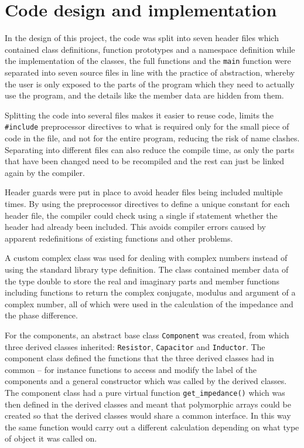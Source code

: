 \section{Code design and implementation}
\label{sec:code}
In the design of this project, the code was split into seven header files which contained class definitions, function prototypes and a namespace definition while the implementation of the classes, the full functions and the \verb!main! function were separated into seven source files in line with the practice of abstraction, whereby the user is only exposed to the parts of the program which they need to actually use the program, and the details like the member data are hidden from them.

Splitting the code into several files makes it easier to reuse code, limits the \verb!#include! preprocessor directives to what is required only for the small piece of code in the file, and not for the entire program, reducing the risk of name clashes. Separating into different files can also reduce the compile time, as only the parts that have been changed need to be recompiled and the rest can just be linked again by the compiler.

Header guards were put in place to avoid header files being included multiple times. By using the preprocessor directives to define a unique constant for each header file, the compiler could check using a single if statement whether the header had already been included. This avoids compiler errors caused by apparent redefinitions of existing functions and other problems.

A custom complex class was used for dealing with complex numbers instead of using the standard library type definition. The class contained member data of the type double to store the real and imaginary parts and member functions including functions to return the complex conjugate, modulus and argument of a complex number, all of which were used in the calculation of the impedance and the phase difference.

For the components, an abstract base class \verb!Component! was created, from which three derived classes inherited: \verb!Resistor!, \verb!Capacitor! and \verb!Inductor!. The component class defined the functions that the three derived classes had in common -- for instance functions to access and modify the label of the components and a general constructor which was called by the derived classes. The component class had a pure virtual function \verb!get_impedance()! which was then defined in the derived classes and meant that polymorphic arrays could be created so that the derived classes would share a common interface. In this way the same function would carry out a different calculation depending on what type of object it was called on.

